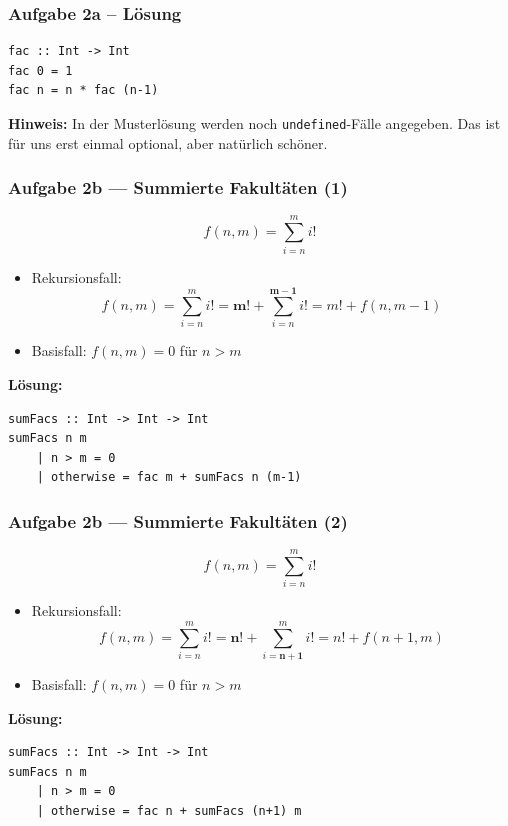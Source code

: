 \documentclass{beamer}
\begin{document}
	\begin{frame}[fragile] \frametitle{Aufgabe 2a -- Lösung}
		\begin{lstlisting}[style=bg]
fac :: Int -> Int
fac 0 = 1
fac n = n * fac (n-1)
		\end{lstlisting}
		
		\scriptsize
		\textbf{Hinweis:} In der Musterlösung werden noch \texttt{undefined}-Fälle angegeben. Das ist für uns erst einmal optional, aber natürlich schöner.
	\end{frame}


	\begin{frame}[fragile] \frametitle{Aufgabe 2b --- Summierte Fakultäten (1)}
		\footnotesize
		\begin{equation*}
			f(n,m) = \sum_{i=n}^{m} i!
		\end{equation*}
		\pause
		\begin{itemize}
			\item Rekursionsfall: 
			\begin{equation*}
				f(n,m) = \sum_{i=n}^{m} i! = \boldsymbol{m}! + \sum_{i=n}^{\boldsymbol{m-1}} i! = m! + f(n,m-1) 
			\end{equation*}
			\item Basisfall: $f(n,m) = 0$ für $n > m$
		\end{itemize}
		\pause
		
		\textbf{Lösung:} \\[0.5em]
		\begin{lstlisting}[style=bg]
sumFacs :: Int -> Int -> Int
sumFacs n m
	| n > m = 0
	| otherwise = fac m + sumFacs n (m-1)
		\end{lstlisting}
	\end{frame}

	\begin{frame}[fragile] \frametitle{Aufgabe 2b --- Summierte Fakultäten (2)}
		\footnotesize
		\begin{equation*}
			f(n,m) = \sum_{i=n}^{m} i!
		\end{equation*}
		\pause
		\begin{itemize}
			\item Rekursionsfall: 
			\begin{equation*}
				f(n,m) = \sum_{i=n}^{m} i! = \boldsymbol{n}! + \sum_{i=\boldsymbol{n+1}}^{m} i! = n! + f(n+1,m) 
			\end{equation*}
			\item Basisfall: $f(n,m) = 0$ für $n > m$
		\end{itemize}
		\pause
		
		\textbf{Lösung:} \\[0.5em]
		\begin{lstlisting}[style=bg]
sumFacs :: Int -> Int -> Int
sumFacs n m
	| n > m = 0
	| otherwise = fac n + sumFacs (n+1) m
		\end{lstlisting}
	\end{frame}
\end{document}
